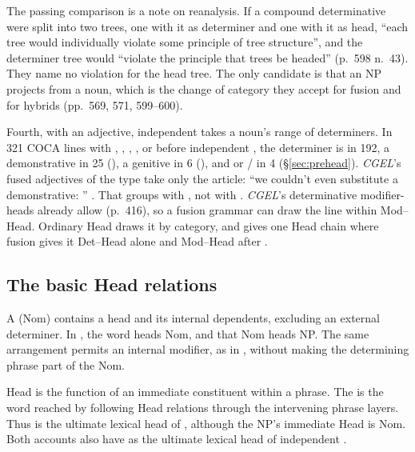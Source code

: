 \documentclass[12pt]{article}
\begin{document}
The passing comparison is a note on reanalysis. If a compound determinative were split into two trees, one with it as determiner and one with it as head, \enquote{each tree would individually violate some principle of tree structure}, and the determiner tree would \enquote{violate the principle that trees be headed} (p.~598 n.~43). They name no violation for the head tree. The only candidate is that an NP projects from a noun, which is the change of category they accept for fusion and for hybrids (pp.~569, 571, 599--600).

Fourth, with an adjective, independent  takes a noun's range of determiners. In 321 COCA lines with , , , , or  before independent , the determiner is  in 192, a demonstrative in 25 (), a genitive in 6 (), and  or / in 4 (§\ref{sec:prehead}). \textit{CGEL}'s fused adjectives of the  type take only the article: \enquote{we couldn't even substitute a demonstrative: } \citep[417]{huddleston2002}. That groups  with , not with . \textit{CGEL}'s determinative modifier-heads already allow  (p.~416), so a fusion grammar can draw the line within Mod--Head. Ordinary Head draws it by category, and gives  one Head chain where fusion gives it Det--Head alone and Mod--Head after .

\subsection{The basic Head relations}\label{sec:head-relations}

A  (Nom) contains a head and its internal dependents, excluding an external determiner. In , the word  heads Nom, and that Nom heads NP. The same arrangement permits an internal modifier, as in , without making the determining phrase part of the Nom.

Head is the function of an immediate constituent within a phrase. The  is the word reached by following Head relations through the intervening phrase layers. Thus  is the ultimate lexical head of , although the NP's immediate Head is Nom. Both accounts also have  as the ultimate lexical head of independent .
\end{document}

